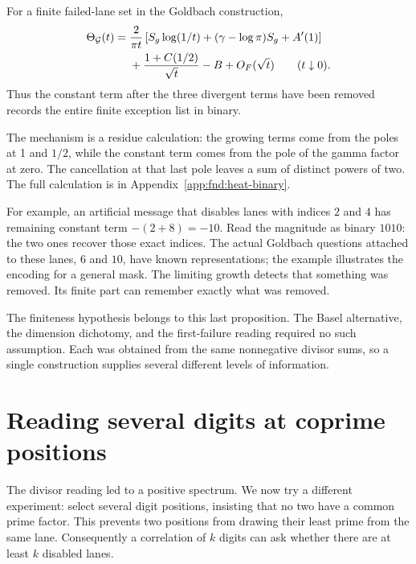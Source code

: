 \begin{proposition}\label{fnd:heat-binary}
For a finite failed-lane set in the Goldbach construction,
\begin{align}
 \Theta_{\mathcal G}(t)={}&\frac2{\pi t}
 \left[S_g\log(1/t)+(\gamma-\log\pi)S_g+A'(1)\right]
 \notag\\
 &+\frac{1+C(1/2)}{\sqrt t}-B+O_F(\sqrt t)
 \qquad(t\downarrow0).
 \label{fnd:heat-binary-expansion}
\end{align}
Thus the constant term after the three divergent terms have been
removed records the entire finite exception list in binary.
\end{proposition}
The mechanism is a residue calculation: the growing terms come from the
poles at 1 and $1/2$, while the constant term comes from the pole of the
gamma factor at zero. The cancellation at that last pole leaves a sum of
distinct powers of two. The full calculation is in
Appendix~\ref{app:fnd:heat-binary}.

For example, an artificial message that disables lanes with indices
$2$ and $4$ has remaining constant term $-(2+8)=-10$. Read the magnitude
as binary $1010$: the two ones recover those exact indices. The actual
Goldbach questions attached to these lanes, $6$ and $10$, have known
representations; the example illustrates the encoding for a general mask.
The limiting growth detects that something was removed. Its finite part
can remember exactly what was removed.

The finiteness hypothesis belongs to this last proposition.  The
Basel alternative, the dimension dichotomy, and the first-failure
reading required no such assumption.  Each was obtained from the
same nonnegative divisor sums, so a single construction supplies
several different levels of information.


\section{Reading several digits at coprime positions}
\label{fnd:correlations}

The divisor reading led to a positive spectrum.  We now try a different
experiment: select several digit positions, insisting that no two have
a common prime factor.  This prevents two positions from drawing their
least prime from the same lane.  Consequently a correlation of $k$
digits can ask whether there are at least $k$ disabled lanes.

